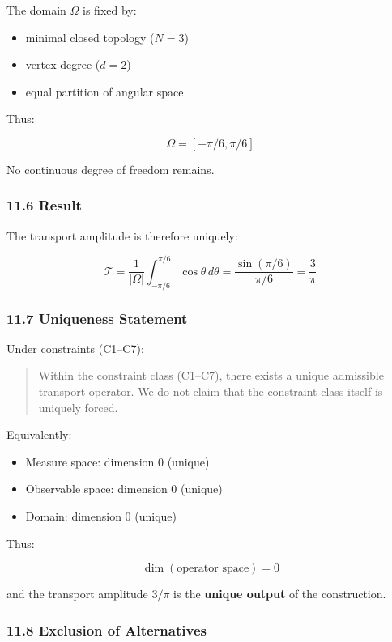 \documentclass[
]{article}
\providecommand{\tightlist}{%
  \setlength{\itemsep}{0pt}\setlength{\parskip}{0pt}}
\begin{document}
The domain \(\Omega\) is fixed by:

\begin{itemize}
\tightlist
\item
  minimal closed topology (\(N = 3\))
\item
  vertex degree (\(d = 2\))
\item
  equal partition of angular space
\end{itemize}

Thus:

\[
\Omega = [-\pi/6, \pi/6]
\]

No continuous degree of freedom remains.

\subsubsection{11.6 Result}\label{result}

The transport amplitude is therefore uniquely:

\[
\mathcal{T} = \frac{1}{|\Omega|} \int_{-\pi/6}^{\pi/6} \cos\theta \, d\theta
= \frac{\sin(\pi/6)}{\pi/6}
= \frac{3}{\pi}
\]

\subsubsection{11.7 Uniqueness Statement}\label{uniqueness-statement}

Under constraints (C1--C7):

\begin{quote}
Within the constraint class (C1--C7), there exists a unique admissible
transport operator. We do not claim that the constraint class itself is
uniquely forced.
\end{quote}

Equivalently:

\begin{itemize}
\tightlist
\item
  Measure space: dimension \(0\) (unique)
\item
  Observable space: dimension \(0\) (unique)
\item
  Domain: dimension \(0\) (unique)
\end{itemize}

Thus:

\[
\dim(\text{operator space}) = 0
\]

and the transport amplitude \(3/\pi\) is the \textbf{unique output} of
the construction.

\subsubsection{11.8 Exclusion of
Alternatives}\label{exclusion-of-alternatives}
\end{document}
